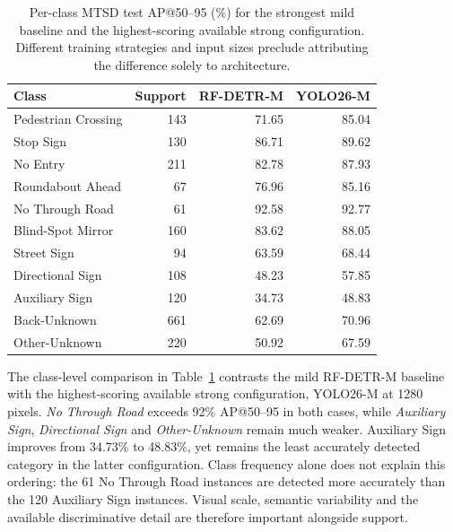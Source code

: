 \begin{table}[htbp]
\centering
\small
\caption{Per-class \gls{MTSD} test \gls{AP}@50--95 (\%) for the strongest mild baseline and the highest-scoring available strong configuration. Different training strategies and input sizes preclude attributing the difference solely to architecture.}
\label{tab:ev-mtsd-classes}
\renewcommand{\arraystretch}{1.15}
\begin{tabularx}{\textwidth}{@{}>{\raggedright\arraybackslash}Xrrr@{}}
\toprule
Class & Support & RF-DETR-M & YOLO26-M \\
\midrule
Pedestrian Crossing & 143 & 71.65 & 85.04 \\
Stop Sign & 130 & 86.71 & 89.62 \\
No Entry & 211 & 82.78 & 87.93 \\
Roundabout Ahead & 67 & 76.96 & 85.16 \\
No Through Road & 61 & 92.58 & 92.77 \\
Blind-Spot Mirror & 160 & 83.62 & 88.05 \\
Street Sign & 94 & 63.59 & 68.44 \\
Directional Sign & 108 & 48.23 & 57.85 \\
Auxiliary Sign & 120 & 34.73 & 48.83 \\
Back-Unknown & 661 & 62.69 & 70.96 \\
Other-Unknown & 220 & 50.92 & 67.59 \\
\bottomrule
\end{tabularx}
\end{table}


The class-level comparison in Table~\ref{tab:ev-mtsd-classes} contrasts the mild RF-DETR-M baseline with the highest-scoring available strong configuration, YOLO26-M at 1280 pixels. \emph{No Through Road} exceeds 92\% \gls{AP}@50--95 in both cases, while \emph{Auxiliary Sign}, \emph{Directional Sign} and \emph{Other-Unknown} remain much weaker. Auxiliary Sign improves from 34.73\% to 48.83\%, yet remains the least accurately detected category in the latter configuration. Class frequency alone does not explain this ordering: the 61 No Through Road instances are detected more accurately than the 120 Auxiliary Sign instances. Visual scale, semantic variability and the available discriminative detail are therefore important alongside support.

